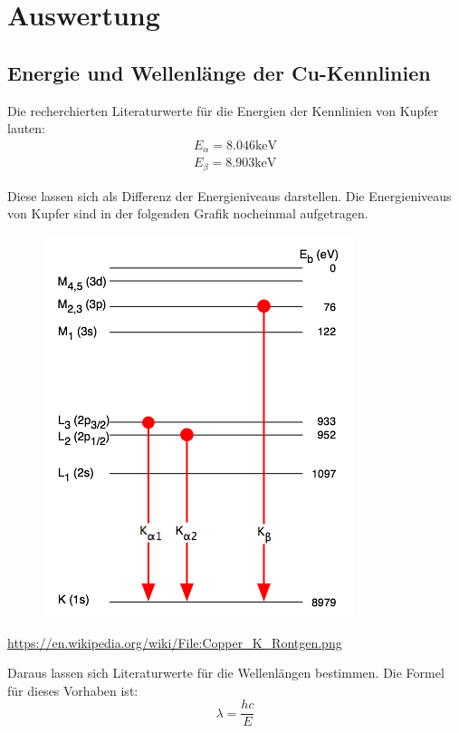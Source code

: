 \section{Auswertung}

\subsection{Energie und Wellenlänge der Cu-Kennlinien}

Die recherchierten Literaturwerte für die Energien der Kennlinien von Kupfer lauten:
\begin{align}
    E_{\alpha} = 8.046 \text{keV} \\
    E_{\beta} = 8.903 \text{keV}
\end{align}

\noindent Diese lassen sich als Differenz der Energieniveaus darstellen. Die Energieniveaus von Kupfer sind in der folgenden Grafik nocheinmal aufgetragen.

\begin{figure}[H]
    \centering
    \includegraphics{"Copper_K_Rontgen.png"}
\end{figure}
\url{https://en.wikipedia.org/wiki/File:Copper_K_Rontgen.png}

Daraus lassen sich Literaturwerte für die Wellenlängen bestimmen. Die Formel für dieses Vorhaben ist:
\begin{displaymath}
    \lambda = \frac{hc}{E}
\end{displaymath}

